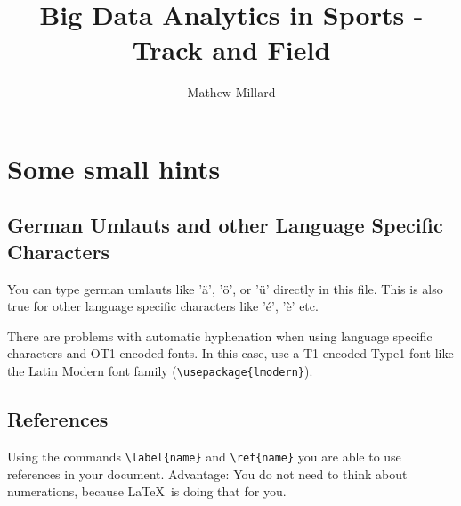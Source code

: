 \documentclass[a4paper,twoside,10pt]{report}
\begin{document}
\pagestyle{empty} %



\title{Big Data Analytics in Sports - Track and Field}
\author{Mathew Millard}
\maketitle



\tableofcontents %
\cleardoublepage %

\pagestyle{plain} %







\chapter{Some small hints}\label{hints}

\section{German Umlauts and other Language Specific Characters}\label{umlauts}
You can type german umlauts like 'ä', 'ö', or 'ü' directly in this file.
This is also true for other language specific characters like 'é', 'è' etc.

There are problems with automatic hyphenation when using language
specific characters and OT1-encoded fonts. In this case, use a
T1-encoded Type1-font like the Latin Modern font family (\verb#\usepackage{lmodern}#).


\section{References}\label{references}
Using the commands \verb#\label{name}# and \verb#\ref{name}# you are able
to use references in your document. Advantage: You do not need to think
about numerations, because \LaTeX\ is doing that for you.
\end{document}

